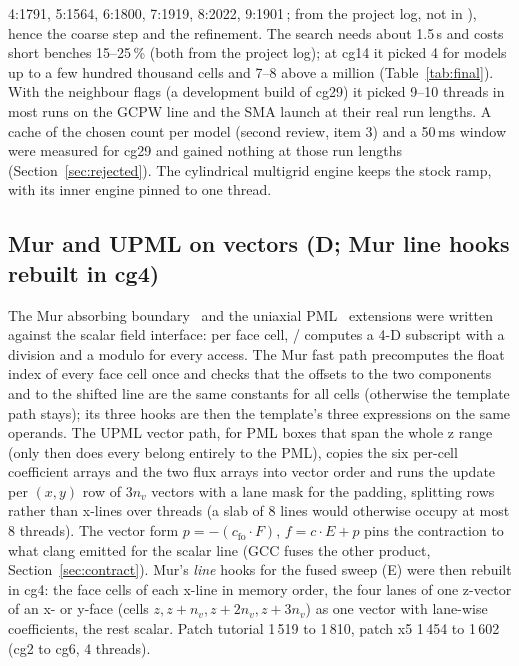 4:1791, 5:1564, 6:1800, 7:1919, 8:2022, 9:1901\,\MC; from the project log, not in ), hence the coarse
step and the refinement.
The search needs about 1.5\,s and costs short benches 15--25\,\% (both from the project log); at cg14 it picked 4 for
models up to a few hundred thousand cells and 7--8 above a million (Table~\ref{tab:final}). With the neighbour flags
(a development build of cg29) it picked 9--10 threads in most runs on the GCPW line and the SMA launch at their real
run lengths. A cache of the chosen count per model (second review, item 3) and a 50\,ms window were measured for cg29
and gained nothing at those run lengths (Section~\ref{sec:rejected}). The cylindrical multigrid engine keeps the stock
ramp, with its inner engine pinned to one thread.

\subsection{Mur and UPML on vectors (D; Mur line hooks rebuilt in cg4)}
The Mur absorbing boundary~\cite{mur1981} and the uniaxial PML~\cite{berenger1994} extensions were written against
the scalar field interface: per face cell, / computes a 4-D subscript with a division and
a modulo for every access. The Mur fast path precomputes the float index of every face cell once and checks that the
offsets to the two components and to the shifted line are the same constants for all cells (otherwise the template
path stays); its three hooks are then the template's three expressions on the same operands. The UPML vector path,
for PML boxes that span the whole z range (only then does every  belong entirely to the PML), copies
the six per-cell coefficient arrays and the two flux arrays into vector order and runs the update per $(x,y)$ row of
$3n_v$ vectors with a lane mask for the padding, splitting rows rather than x-lines over threads (a slab of 8 lines
would otherwise occupy at most 8 threads). The vector form $p=-(c_{\text{fo}}\cdot F)$, $f = c\cdot E + p$ pins the
contraction to what clang emitted for the scalar line (GCC fuses the other product, Section~\ref{sec:contract}).
Mur's \emph{line} hooks for the fused sweep (E) were then rebuilt in cg4: the face cells of each x-line in memory
order, the four lanes of one z-vector of an x- or y-face (cells $z, z+n_v, z+2n_v, z+3n_v$) as one vector with
lane-wise coefficients, the rest scalar. Patch tutorial 1\,519 to 1\,810, patch x5 1\,454 to 1\,602 (cg2 to cg6,
4 threads).

